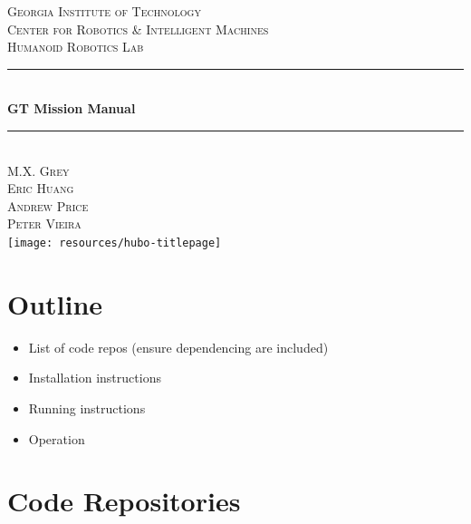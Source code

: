 \documentclass[letterpaper, 10 pt]{report}
\begin{document}
\begin{titlepage}
\center
\textsc{\LARGE Georgia Institute of Technology}\\[1.5cm]
\textsc{\large Center for Robotics \& Intelligent Machines}\\[0.5cm]
\textsc{\large Humanoid Robotics Lab}\\[0.5cm]
\rule{\linewidth}{0.5mm}\\[0.4cm]
{\huge \bfseries GT Mission Manual}\\[0.4cm]
\rule{\linewidth}{0.5mm}\\[1.5cm]
\textsc{\normalsize M.X. Grey}\\
\textsc{\normalsize Eric Huang}\\
\textsc{\normalsize Andrew Price}\\
\textsc{\normalsize Peter Vieira}\\[1.5cm]
\texttt{[image: resources/hubo-titlepage]}
\vfill
\end{titlepage}

\section*{Outline}
\begin{itemize}
\item List of code repos (ensure dependencing are included)
\item Installation instructions
\item Running instructions
\item Operation
\end{itemize}

\section*{Code Repositories}
\end{document}
